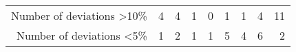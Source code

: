 \begin{table}[phtb]
\begin{center}
\begin{tabular}{rrrrrrrrr}
            Number of deviations >10\%   & 4              & 4            & 1             & 0              & 1              & 1              & 4             & 11             \\
            Number of deviations  <5\%   & 1              & 2            & 1             & 1              & 5              & 4              & 6             & 2              \\
            \hline
        \end{tabular}
    \end{center}
\end{table}

